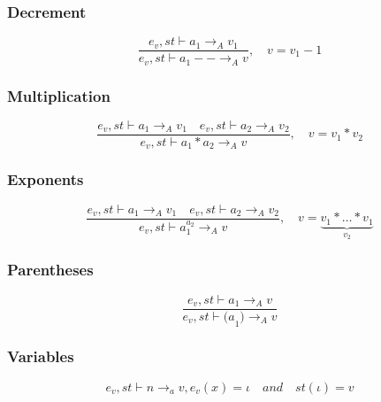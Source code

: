 \subsubsection{Decrement}
\begin{equation}
	\frac { { e }_{ v },st\vdash { a }_{ 1 }{ \rightarrow  }_{ A }{ v }_{ 1 } }{ { e }_{ v },st\vdash { a }_{ 1 }--{ \rightarrow  }_{ A }{ v } } ,\quad v={ v }_{ 1 }-1
\end{equation}

\subsubsection{Multiplication}
\begin{equation}
	\frac { { e }_{ v },st\vdash { a }_{ 1 }{ \rightarrow  }_{ A }{ v }_{ 1 }\quad { e }_{ v },st\vdash { a }_{ 2 }{ \rightarrow  }_{ A }{ v }_{ 2 } }{ { e }_{ v },st\vdash { a }_{ 1 }\ast { a }_{ 2 }{ \rightarrow  }_{ A }{ v } } ,\quad v={ v }_{ 1 }\ast { v }_{ 2 }
\end{equation}

\subsubsection{Exponents}
\begin{equation}
	\frac { { e }_{ v },st\vdash { a }_{ 1 }{ \rightarrow  }_{ A }{ v }_{ 1 }\quad { e }_{ v },st\vdash { a }_{ 2 }{ \rightarrow  }_{ A }{ v }_{ 2 } }{ { e }_{ v },st\vdash { a }_{ 1 }^{ { a }_{ 2 } }{ \rightarrow  }_{ A }{ v } } ,\quad v=\underset { { v }_{ 2 } }{ \underbrace { v_{ 1 }*\dots *v_{ 1 } }  }
\end{equation}


\subsubsection{Parentheses}
\begin{equation}
	\frac { { e }_{ v },st\vdash { a }_{ 1 }{ \rightarrow  }_{ A }{ v } }{ { e }_{ v },st\vdash { (a }_{ 1 }){ \rightarrow  }_{ A }{ v } }
\end{equation}


\subsubsection{Variables}
\begin{equation}
	{ e }_{ v },st\vdash n{ \rightarrow  }_{ a }v, { e }_{ v }(x)=\iota\quad and\quad st(\iota )=v
\end{equation}

